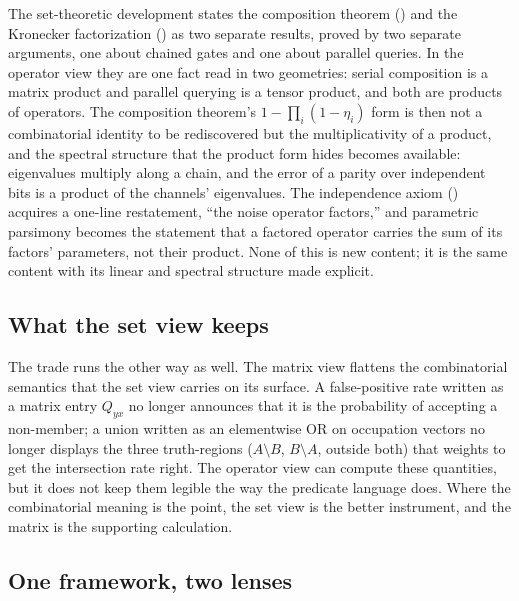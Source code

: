 The set-theoretic development states the composition theorem
() and the Kronecker factorization
() as two separate results, proved by two separate
arguments, one about chained gates and one about parallel queries. In the
operator view they are one fact read in two geometries: serial composition is a
matrix product and parallel querying is a tensor product, and both are products
of operators. The composition theorem's $1 - \prod_i (1 - \eta_i)$ form is then
not a combinatorial identity to be rediscovered but the multiplicativity of a
product, and the spectral structure that the product form hides becomes
available: eigenvalues multiply along a chain, and the error of a parity over
independent bits is a product of the channels' eigenvalues. The independence
axiom () acquires a one-line restatement, ``the noise
operator factors,'' and parametric parsimony becomes the statement that a
factored operator carries the sum of its factors' parameters, not their
product. None of this is new content; it is the same content with its linear and
spectral structure made explicit.

\subsection*{What the set view keeps}

The trade runs the other way as well. The matrix view flattens the
combinatorial semantics that the set view carries on its surface. A
false-positive rate written as a matrix entry $Q_{yx}$ no longer announces that
it is the probability of accepting a non-member; a union written as an
elementwise OR on occupation vectors no longer displays the three truth-regions
($A \setminus B$, $B \setminus A$, outside both) that
 weights to get the intersection rate right. The
operator view can compute these quantities, but it does not keep them legible
the way the predicate language does. Where the combinatorial meaning is the
point, the set view is the better instrument, and the matrix is the supporting
calculation.

\subsection*{One framework, two lenses}

